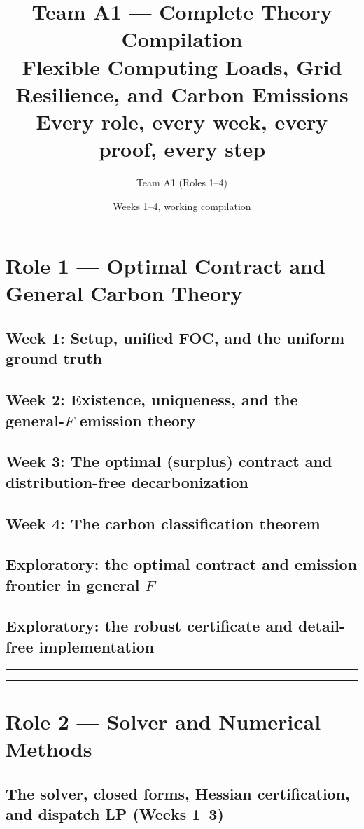 \documentclass[11pt,reqno]{report}
\title{\textbf{Team A1 --- Complete Theory Compilation}\\[4pt]
\large Flexible Computing Loads, Grid Resilience, and Carbon Emissions\\[6pt]
\normalsize Every role, every week, every proof, every step}
\author{Team A1 (Roles 1--4)}
\date{Weeks 1--4, working compilation}
\theoremstyle{plain}
\theoremstyle{definition}
\theoremstyle{remark}
\begin{document}
\maketitle
{\small\tableofcontents}

\part{Role 1 --- Optimal Contract and General Carbon Theory}
\chapter{Week 1: Setup, unified FOC, and the uniform ground truth}

\chapter{Week 2: Existence, uniqueness, and the general-\texorpdfstring{$F$}{F} emission theory}

\chapter{Week 3: The optimal (surplus) contract and distribution-free decarbonization}

\chapter{Week 4: The carbon classification theorem}

\chapter{Exploratory: the optimal contract and emission frontier in general \texorpdfstring{$F$}{F}}

\chapter{Exploratory: the robust certificate and detail-free implementation}


\bigskip\hrule\bigskip


\bigskip\hrule\bigskip


\part{Role 2 --- Solver and Numerical Methods}
\chapter{The solver, closed forms, Hessian certification, and dispatch LP (Weeks 1--3)}

\end{document}
